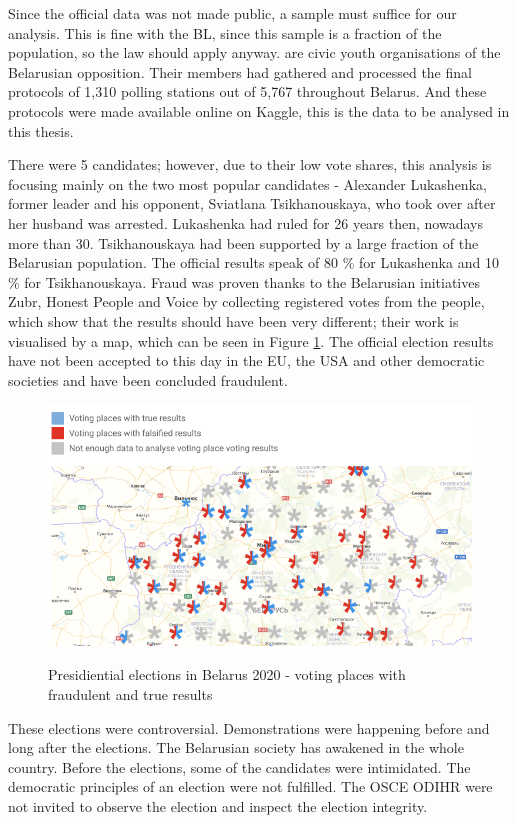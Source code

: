 Since the official data was not made public, a sample must suffice for our analysis. This is fine with the BL, since this sample is a fraction of the population, so the law should apply anyway. \citeauthor{BLR20data} are civic youth organisations of the Belarusian opposition. Their members had gathered and processed the final protocols of 1,310 polling stations out of 5,767 throughout Belarus. And these protocols were made available online on Kaggle, this is the data to be analysed in this thesis. \cite{BLR20data}

There were 5 candidates; however, due to their low vote shares, this analysis is focusing mainly on the two most popular candidates - Alexander Lukashenka, former leader and his opponent, Sviatlana Tsikhanouskaya, who took over after her husband was arrested. Lukashenka had ruled for 26 years then, nowadays more than 30. Tsikhanouskaya had been supported by a large fraction of the Belarusian population. The official results speak of 80 \% for Lukashenka and 10 \% for Tsikhanouskaya. Fraud was proven thanks to the Belarusian initiatives Zubr, Honest People and Voice by collecting registered votes from the people, which show that the results should have been very different; their work is visualised by a map, which can be seen in Figure \ref{fig:BLR-fraud-map}. The official election results have not been accepted to this day in the EU, the USA and other democratic societies and have been concluded fraudulent. \cite{Bedford_2021,BLR20data,Voice20}


\begin{figure}[h]
    \centering
    \caption{Presidiential elections in Belarus 2020 - voting places with fraudulent and true results}
    \includegraphics[width=0.75\linewidth]{BT-DT-eng//TemplateBT-DT//img/BLR-fraud-map.png}
    \label{fig:BLR-fraud-map}
\end{figure}

These elections were controversial. Demonstrations were happening before and long after the elections. The Belarusian society has awakened in the whole country. Before the elections, some of the candidates were intimidated. The democratic principles of an election were not fulfilled. The OSCE ODIHR were not invited to observe the election and inspect the election integrity. \cite{OBSE-BLR-concern,OBSE-BLR-no-report, Bedford_2021}

